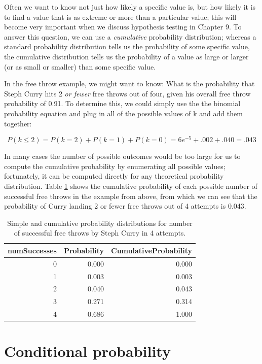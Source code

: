 \documentclass[12pt,]{book}
\theoremstyle{definition}
\theoremstyle{definition}
\theoremstyle{definition}
\theoremstyle{remark}
\begin{document}
Often we want to know not just how likely a specific value is, but how likely it is to find a value that is as extreme or more than a particular value; this will become very important when we discuss hypothesis testing in Chapter 9. To answer this question, we can use a \emph{cumulative} probability distribution; whereas a standard probability distribution tells us the probability of some specific value, the cumulative distribution tells us the probability of a value as large or larger (or as small or smaller) than some specific value.

In the free throw example, we might want to know: What is the probability that Steph Curry hits 2 \emph{or fewer} free throws out of four, given his overall free throw probability of 0.91. To determine this, we could simply use the the binomial probability equation and plug in all of the possible values of k and add them together:

\[
P(k\le2)= P(k=2) + P(k=1) + P(k=0) = 6e^{-5} + .002 + .040 = .043  
\]

In many cases the number of possible outcomes would be too large for us to compute the cumulative probability by enumerating all possible values; fortunately, it can be computed directly for any theoretical probability distribution. Table \ref{tab:freethrow} shows the cumulative probability of each possible number of successful free throws in the example from above, from which we can see that the probability of Curry landing 2 or fewer free throws out of 4 attempts is 0.043.

\begin{table}

\caption{\label{tab:freethrow}Simple and cumulative probability distributions for number of successful free throws by Steph Curry in 4 attempts.}
\centering
\begin{tabular}[t]{r|r|r}
\hline
numSuccesses & Probability & CumulativeProbability\\
\hline
0 & 0.000 & 0.000\\
\hline
1 & 0.003 & 0.003\\
\hline
2 & 0.040 & 0.043\\
\hline
3 & 0.271 & 0.314\\
\hline
4 & 0.686 & 1.000\\
\hline
\end{tabular}
\end{table}

\hypertarget{conditional-probability}{%
\section{Conditional probability}\label{conditional-probability}}
\end{document}
